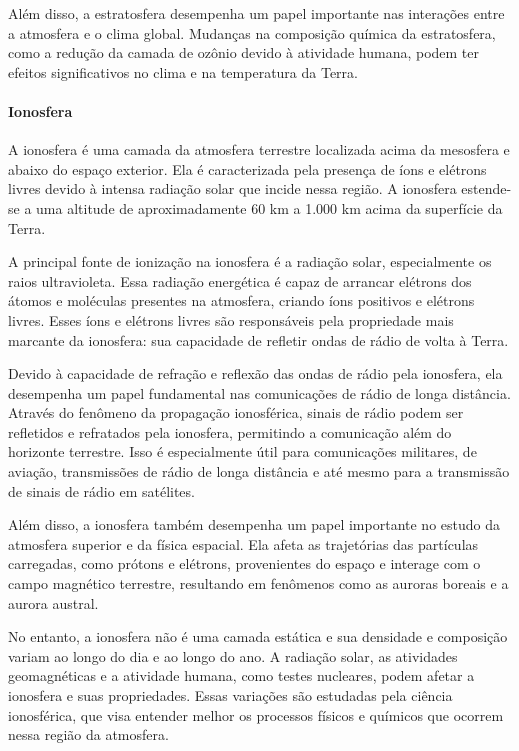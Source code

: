\documentclass[a4paper, 12pt, onecolumn,singlespacing]{article}
\begin{document}
	Além disso, a estratosfera desempenha um papel importante nas interações entre a atmosfera e o clima global. Mudanças na composição química da estratosfera, como a redução da camada de ozônio devido à atividade humana, podem ter efeitos significativos no clima e na temperatura da Terra.
	
	\paragraph{Ionosfera} A ionosfera é uma camada da atmosfera terrestre localizada acima da mesosfera e abaixo do espaço exterior. Ela é caracterizada pela presença de íons e elétrons livres devido à intensa radiação solar que incide nessa região. A ionosfera estende-se a uma altitude de aproximadamente 60 km a 1.000 km acima da superfície da Terra.
	
	A principal fonte de ionização na ionosfera é a radiação solar, especialmente os raios ultravioleta. Essa radiação energética é capaz de arrancar elétrons dos átomos e moléculas presentes na atmosfera, criando íons positivos e elétrons livres. Esses íons e elétrons livres são responsáveis pela propriedade mais marcante da ionosfera: sua capacidade de refletir ondas de rádio de volta à Terra.
	
	Devido à capacidade de refração e reflexão das ondas de rádio pela ionosfera, ela desempenha um papel fundamental nas comunicações de rádio de longa distância. Através do fenômeno da propagação ionosférica, sinais de rádio podem ser refletidos e refratados pela ionosfera, permitindo a comunicação além do horizonte terrestre. Isso é especialmente útil para comunicações militares, de aviação, transmissões de rádio de longa distância e até mesmo para a transmissão de sinais de rádio em satélites.
	
	Além disso, a ionosfera também desempenha um papel importante no estudo da atmosfera superior e da física espacial. Ela afeta as trajetórias das partículas carregadas, como prótons e elétrons, provenientes do espaço e interage com o campo magnético terrestre, resultando em fenômenos como as auroras boreais e a aurora austral.
	
	No entanto, a ionosfera não é uma camada estática e sua densidade e composição variam ao longo do dia e ao longo do ano. A radiação solar, as atividades geomagnéticas e a atividade humana, como testes nucleares, podem afetar a ionosfera e suas propriedades. Essas variações são estudadas pela ciência ionosférica, que visa entender melhor os processos físicos e químicos que ocorrem nessa região da atmosfera.
	
\end{document}
